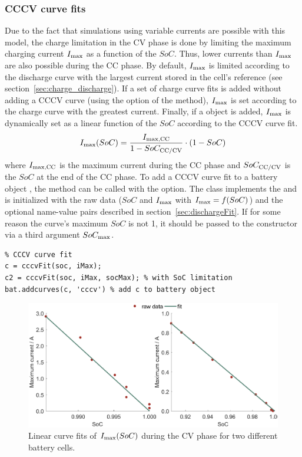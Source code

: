 \subsubsection{CCCV curve fits}
\label{sec:cccvFit}
Due to the fact that simulations using variable currents are possible with this model, the charge limitation in the CV phase is done by limiting the maximum charging current $I_\text{max}$ as a function of the $SoC$. Thus, lower currents than $I_\text{max}$ are also possible during the CC phase. By default, $I_\text{max}$ is limited according to the discharge curve with the largest current stored in the cell's  reference (see section~\ref{sec:charge_discharge}). If a set of charge curve fits is added without adding a CCCV curve (using the  option of the  method), $I_\text{max}$ is set according to the charge curve with the greatest current. Finally, if a  object is added, $I_\text{max}$ is dynamically set as a linear function of the $SoC$ according to the CCCV curve fit. 
\begin{equation}
I_\text{max}(SoC) = \frac{I_\text{max,CC}}{1-SoC_\text{CC/CV}}\cdot (1 - SoC)
\end{equation}
where $I_\text{max,CC}$ is the maximum current during the CC phase and $SoC_\text{CC/CV}$ is the $SoC$ at the end of the CC phase.
To add a CCCV curve fit to a battery object , the  method can be called with the  option. The  class implements the  and is initialized with the raw data ($SoC$ and $I_\text{max}$ with $I_\text{max} = f(SoC)$) and the optional name-value pairs described in section~\ref{sec:dischargeFit}. If for some reason the curve's maximum $SoC$ is not 1, it should be passed to the constructor via a third argument $SoC_\text{max}$.
\begin{lstlisting}
% CCCV curve fit
c = cccvFit(soc, iMax);
c2 = cccvFit(soc, iMax, socMax); % with SoC limitation
bat.addcurves(c, 'cccv') % add c to battery object
\end{lstlisting}
\begin{figure}[t!]
	\captionsetup{type=figure}
	\centering
	\includegraphics[width=\textwidth]{cccvFit}
	\caption[Linear curve fits of $I\subi{max}(SoC)$ during the CV phase for two different battery cells]{Linear curve fits of $I\subi{max}(SoC)$ during the CV phase for two different battery cells.}
	\label{fig:cccvFit}
\end{figure}

